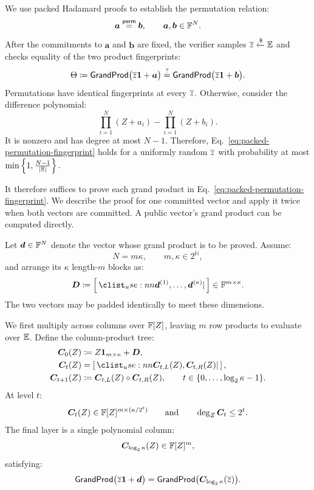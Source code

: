 We use packed Hadamard proofs to establish the permutation relation:
\[
    \bm a\stackrel{\mathsf{perm}}{=}\bm b,
    \qquad
    \bm a,\bm b\in{\mathbb{F}}^N.
\]
After the commitments to \(\bm a\) and \(\bm b\) are fixed, the
verifier samples
\(
    \overline{z}\mathrel{\xleftarrow{\$}}\mathbb{E}
\)
and checks equality of the two product fingerprints:
\begin{equation}
   \Theta \coloneqq  \mathsf{GrandProd}
    \bigl(\overline{z}\bm 1+\bm a\bigr)
    \mathrel{\overset{\mathrm{?}}{=}}
    \mathsf{GrandProd}
    \bigl(\overline{z}\bm 1+\bm b\bigr).
\label{eq:packed-permutation-fingerprint}
\end{equation}
Permutations have identical fingerprints at every \(\overline{z}\).
Otherwise, consider the difference polynomial:
\[
    \prod_{i=1}^{N}(Z+a_i)
    -
    \prod_{i=1}^{N}(Z+b_i).
\]
It is nonzero and has degree at most \(N-1\). Therefore,
Eq.~\eqref{eq:packed-permutation-fingerprint} holds for a
uniformly random \(\overline{z}\) with probability at most
\(
    \min\left\{
        1,\frac{N-1}{|\mathbb{E}|}
    \right\}.
\)

It therefore suffices to prove each grand product in
Eq.~\eqref{eq:packed-permutation-fingerprint}. We describe the
proof for one committed vector and apply it twice when both
vectors are committed. A public vector's grand product can be
computed directly.

Let \(\bm d\in{\mathbb{F}}^N\) denote the vector whose grand product is
to be proved. Assume:
\[
    N=m\kappa,
    \qquad
    m,\kappa\in2^{\mathbb N},
\]
and arrange its \(\kappa\) length-\(m\) blocks as:
\[
    \bm D
    \coloneqq
    \concat{
        \bm d^{(1)},\ldots,\bm d^{(\kappa)}
    }
    \in\Field^{m\times\kappa}.
\]
The two vectors may be padded identically to meet these dimensions.

We first multiply across columns over \({\mathbb{F}}[Z]\), leaving
\(m\) row products to evaluate over \(\mathbb{E}\).
Define the column-product tree:
\begin{equation}
\begin{aligned}
    \bm C_0(Z)
    &\coloneqq
    Z\bm 1_{m\times\kappa}+\bm D,\\
    \bm C_t(Z)
    &=
    \concat{
        \bm C_{t,L}(Z),
        \bm C_{t,R}(Z)
    },\\
    \bm C_{t+1}(Z)
    &\coloneqq
    \bm C_{t,L}(Z)
    \circ
    \bm C_{t,R}(Z),
    \qquad
    t\in\{0,\ldots,\log_2\kappa-1\}.
\end{aligned}
\label{eq:packed-permutation-product-tree}
\end{equation}
At level \(t\):
\[
    \bm C_t(Z)
    \in
    {\mathbb{F}}[Z]^{m\times(\kappa/2^t)}
    \qquad\text{and}\qquad
    \deg_Z\bm C_t\leq2^t.
\]
The final layer is a single polynomial column:
\[
    \bm C_{\log_2 \kappa}(Z)
    \in{\mathbb{F}}[Z]^m,
\]
satisfying:
\begin{equation*}
    \mathsf{GrandProd}
    \bigl(\overline{z}\bm 1+\bm d\bigr)
    =
    \mathsf{GrandProd}
    \bigl(\bm C_{\log_2 \kappa}(\overline{z})\bigr).
\end{equation*}

